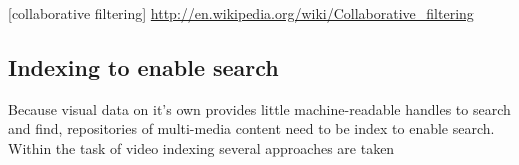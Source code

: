 [collaborative filtering] \url{http://en.wikipedia.org/wiki/Collaborative_filtering}

\subsection{Indexing to enable search}
Because visual data on it's own provides little machine-readable handles to search and find, repositories of multi-media content need to be index to enable search. Within the task of video indexing several approaches are taken 




